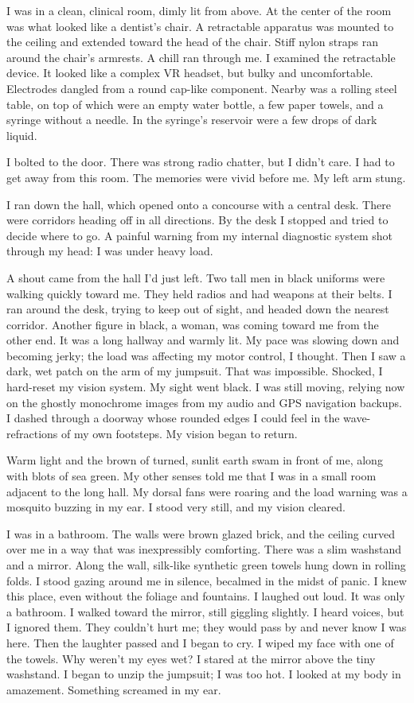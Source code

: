 \documentclass[10pt,b5paper]{article}
\begin{document}
I was in a clean, clinical room, dimly lit from above.  At the center
of the room was what looked like a dentist's chair. A retractable
apparatus was mounted to the ceiling and extended toward the head of
the chair. Stiff nylon straps ran around the chair's armrests. A chill
ran through me. I examined the retractable device. It looked like a
complex VR headset, but bulky and uncomfortable. Electrodes dangled
from a round cap-like component. Nearby was a rolling steel table,
on top of which were an empty water bottle, a few paper towels,
and a syringe without a needle. In the syringe's reservoir were a
few drops of dark liquid.

I bolted to the door. There was strong radio chatter, but I didn't
care. I had to get away from this room. The memories were vivid before
me. My left arm stung.

I ran down the hall, which opened onto a concourse with a central desk.
There were corridors heading off in all directions. By the desk I
stopped and tried to decide where to go. A painful warning from
my internal diagnostic system shot through my head: I was under
heavy load.

A shout came from the hall I'd just left. Two tall men in black
uniforms were walking quickly toward me. They held radios and had
weapons at their belts.  I ran around the desk, trying to keep out
of sight, and headed down the nearest corridor. Another figure in
black, a woman, was coming toward me from the other end. It was a long
hallway and warmly lit. My pace was slowing down and becoming jerky;
the load was affecting my motor control, I thought. Then I saw a dark,
wet patch on the arm of my jumpsuit. That was impossible. Shocked, I
hard-reset my vision system. My sight went black. I was still moving,
relying now on the ghostly monochrome images from my audio and GPS
navigation backups. I dashed through a doorway whose rounded edges
I could feel in the wave-refractions of my own footsteps. My vision
began to return.

Warm light and the brown of turned, sunlit earth swam in front of me,
along with blots of sea green. My other senses told me that I was in
a small room adjacent to the long hall. My dorsal fans were roaring
and the load warning was a mosquito buzzing in my ear. I stood very
still, and my vision cleared.

I was in a bathroom. The walls were brown glazed brick, and the ceiling
curved over me in a way that was inexpressibly comforting. There was a
slim washstand and a mirror. Along the wall, silk-like synthetic green
towels hung down in rolling folds. I stood gazing around me in silence,
becalmed in the midst of panic.  I knew this place, even without the
foliage and fountains. I laughed out loud. It was only a bathroom. I
walked toward the mirror, still giggling slightly.  I heard voices,
but I ignored them.  They couldn't hurt me; they would pass by and
never know I was here. Then the laughter passed and I began to cry. I
wiped my face with one of the towels.  Why weren't my eyes wet? I
stared at the mirror above the tiny washstand. I began to unzip the
jumpsuit; I was too hot. I looked at my body in amazement. Something
screamed in my ear.
\end{document}
